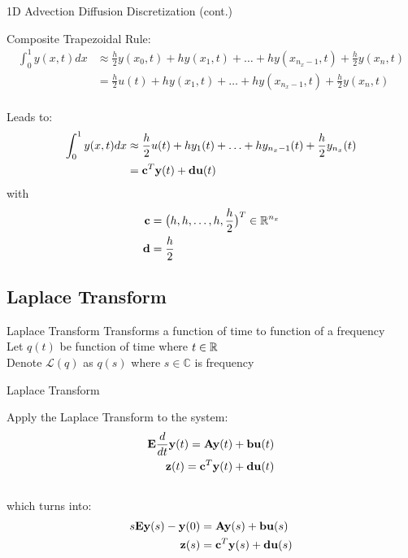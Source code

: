 \begin{frame}{1D Advection Diffusion Discretization (cont.)}

Composite Trapezoidal Rule:
\begin{align*}
     \int_{0}^{1} y(x,t)dx & \approx \frac{h}{2} y(x_0,t) + hy(x_1,t) + \ldots + hy(x_{n_x -1},t) + \frac{h}{2} y(x_n,t)
     \\
     & = \frac{h}{2}u(t) + hy(x_1,t) + \ldots + hy(x_{n_x -1},t) + \frac{h}{2} y(x_n,t)\\
\end{align*}
    
Leads to:
\begin{align*}
     \int_{0}^{1} y(x,t)dx & \approx \frac{h}{2} u(t) + hy_1(t) + \ldots + hy_{n_x -1}(t) + \frac{h}{2} y_{n_x}(t)
     \\
     & = {\bf c}^{T} {\bf y}(t) + {\bf d}{\bf u}(t)\\
\end{align*}
with 
\begin{align*}
{\bf c} &=  \big( h,h,\ldots,h,\frac{h}{2} \big)^{T} \in \mathbb{R}^{n_x}\\
{\bf d} &= \frac{h}{2}
\end{align*}

\end{frame}

\subsection{Laplace Transform}

\begin{frame}{Laplace Transform}
Transforms a function of time to function of a frequency\\
\bigskip
Let $q(t)$ be function of time where $t \in \mathbb{R}$\\
\bigskip
Denote $\mathcal{L}(q)$ as $q(s)$ where $s \in \mathbb{C}$ is frequency
\end{frame}
\begin{frame}{Laplace Transform}

Apply the Laplace Transform to the system:
    \begin{align*}
            {\bf E}\frac{d}{dt} {\bf y}(t)  = {\mathbf A} {\bf y}(t) + {\bf b}{\bf u}(t)\\
            {\bf z}(t) = {\bf c}^T {\bf y}(t) + {\bf d}{\bf u}(t)
    \end{align*}
\\
which turns into:
\\
    \begin{align*}
        s{\bf E} {\bf y}(s) - {\bf y}(0) &= {\bf A} {\bf y}(s) + {\bf b}{\bf u}(s)\\
        {\bf z}(s) &= {\bf c}^T {\bf y}(s) + {\bf d} {\bf u}(s)
    \end{align*}

\end{frame}

